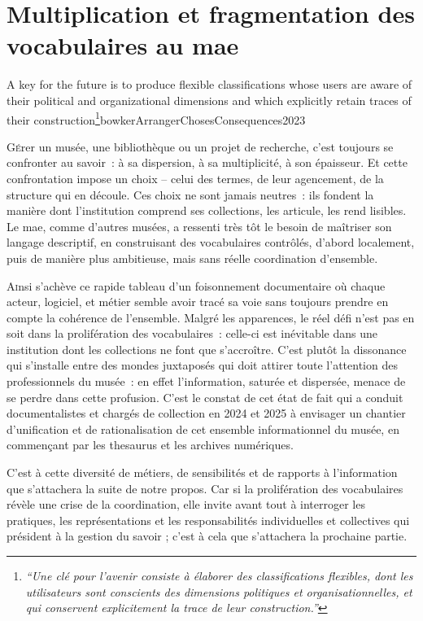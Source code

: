 \chapter[Les vocabulaires contrôlés au \ac{mae}]{\label{II-A} Multiplication et fragmentation des vocabulaires au \ac{mae}}


\begin{myquote}
	{A key for the future is to produce flexible classifications whose users are aware of their political and organizational dimensions and which explicitly retain traces of their construction\footnote{\textit{\enquote{Une clé pour l’avenir consiste à élaborer des classifications flexibles, dont les utilisateurs sont conscients des dimensions politiques et organisationnelles, et qui conservent explicitement la trace de leur construction.}}}}{bowkerArrangerChosesConsequences2023}
\end{myquote}

\lettrine{G}érer un musée, une bibliothèque ou un projet de recherche, c’est toujours se confronter au savoir~: à sa dispersion, à sa multiplicité, à son épaisseur. Et cette confrontation impose un choix – celui des termes, de leur agencement, de la structure qui en découle. Ces choix ne sont jamais neutres~: ils fondent la manière dont l’institution comprend ses collections, les articule, les rend lisibles. Le \ac{mae}, comme d’autres musées, a ressenti très tôt le besoin de maîtriser son langage descriptif, en construisant des vocabulaires contrôlés, d’abord localement, puis de manière plus ambitieuse, mais sans réelle coordination d’ensemble.






\bigskip
\bigskip
\bigskip

\lettrine{A}insi s’achève ce rapide tableau d’un foisonnement documentaire où chaque acteur, logiciel, et métier semble avoir tracé sa voie sans toujours prendre en compte la cohérence de l'ensemble. Malgré les apparences, le réel défi n'est pas en soit dans la prolifération des vocabulaires~: celle-ci est inévitable dans une institution dont les collections ne font que s'accroître.  C'est plutôt la dissonance qui s’installe entre des mondes juxtaposés qui doit attirer toute l'attention des professionnels du musée~: en effet  l’information, saturée et dispersée, menace de se perdre dans cette profusion. C'est le constat de cet état de fait qui a conduit documentalistes et chargés de collection en 2024 et 2025 à envisager un chantier d'unification et de rationalisation de cet ensemble informationnel du musée, en commençant par les \gls{thesaurus} et les archives numériques.

C’est à cette diversité de métiers, de sensibilités et de rapports à l’information que s’attachera la suite de notre propos. Car si la prolifération des vocabulaires révèle une crise de la coordination, elle invite avant tout à interroger les pratiques, les représentations et les responsabilités individuelles et collectives qui président à la gestion du savoir ; c'est à cela que s'attachera la prochaine partie.